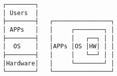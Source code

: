 \documentclass[varwidth,crop]{standalone}
\begin{document}
\begin{verbatim}
┌────────┐
│ Users  │    
├────────┤   ┌────────────────┐ 
│ APPs   │   │     ┌────────┐ │ 
├────────┤   │     │   ┌──┐ │ │ 
│  OS    │   │APPs │OS │HW│ │ │ 
├────────┤   │     │   └──┘ │ │ 
│Hardware│   │     └────────┘ │ 
└────────┘   └────────────────┘
\end{verbatim}
\end{document}
